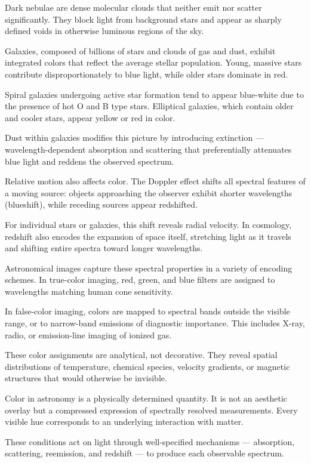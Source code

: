 Dark nebulae are dense molecular clouds that neither emit nor scatter significantly. They block light from background stars and appear as sharply defined voids in otherwise luminous regions of the sky.

Galaxies, composed of billions of stars and clouds of gas and dust, exhibit integrated colors that reflect the average stellar population. Young, massive stars contribute disproportionately to blue light, while older stars dominate in red.

Spiral galaxies undergoing active star formation tend to appear blue-white due to the presence of hot O and B type stars. Elliptical galaxies, which contain older and cooler stars, appear yellow or red in color.

Dust within galaxies modifies this picture by introducing extinction --- wavelength-dependent absorption and scattering that preferentially attenuates blue light and reddens the observed spectrum.

Relative motion also affects color. The Doppler effect shifts all spectral features of a moving source: objects approaching the observer exhibit shorter wavelengths (blueshift), while receding sources appear redshifted.

For individual stars or galaxies, this shift reveals radial velocity. In cosmology, redshift also encodes the expansion of space itself, stretching light as it travels and shifting entire spectra toward longer wavelengths.

Astronomical images capture these spectral properties in a variety of encoding schemes. In true-color imaging, red, green, and blue filters are assigned to wavelengths matching human cone sensitivity.

In false-color imaging, colors are mapped to spectral bands outside the visible range, or to narrow-band emissions of diagnostic importance. This includes X-ray, radio, or emission-line imaging of ionized gas.

These color assignments are analytical, not decorative. They reveal spatial distributions of temperature, chemical species, velocity gradients, or magnetic structures that would otherwise be invisible.

Color in astronomy is a physically determined quantity. It is not an aesthetic overlay but a compressed expression of spectrally resolved measurements. Every visible hue corresponds to an underlying interaction with matter.

These conditions act on light through well-specified mechanisms --- absorption, scattering, reemission, and redshift --- to produce each observable spectrum.


